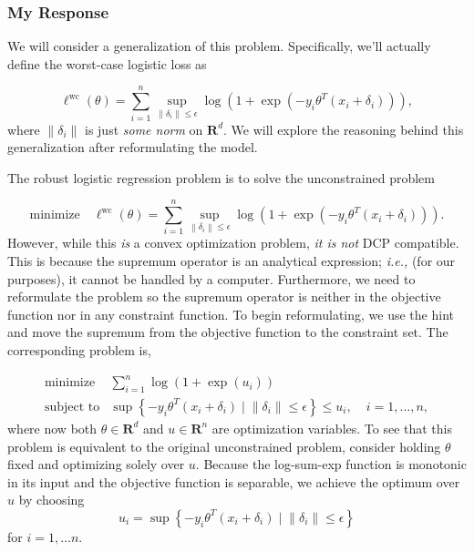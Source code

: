 \documentclass[12pt,reqno]{article}
\theoremstyle{definition}
\numberwithin{equation}{section}
\begin{document}
\subsubsection*{My Response}

\noindent We will consider a generalization of this problem. Specifically, we'll actually define the worst-case logistic loss as

\[
\ell^{\mathrm{wc}}(\theta)=\sum_{i=1}^n \sup _{\left\|\delta_i\right\| \leq \epsilon} \log \left(1+\exp \left(-y_i \theta^T\left(x_i+\delta_i\right)\right)\right),
\]
where $\left\lVert \delta_i \right\rVert$ is just \textit{some norm} on $\mathbf{R}^{d}$. We will explore the reasoning behind
this generalization after reformulating the model.

\noindent The robust logistic regression problem is to solve the unconstrained problem

\[\mathrm{minimize} \quad \ell^{\mathrm{wc}}(\theta)=\sum_{i=1}^n \sup _{\left\|\delta_i\right\| \leq \epsilon} \log \left(1+\exp \left(-y_i \theta^T\left(x_i+\delta_i\right)\right)\right).\]
However, while this \textit{is} a convex optimization problem, \textit{it is not} DCP compatible. This is because
the supremum operator is an analytical expression; \textit{i.e.,} (for our purposes), it cannot be handled by a computer.
Furthermore, we need to reformulate the problem so the supremum operator is neither in the objective function nor in any
constraint function. To begin reformulating, we use the hint and move the supremum from the objective function
to the constraint set. The corresponding problem is,

\[\begin{array}{lll}
\text{minimize} \; & \sum_{i=1}^n \log \left(1+\exp \left(u_i\right)\right) & \\
\text{subject to} & \sup \left\{-y_i \theta^T\left(x_i+\delta_i\right) \mid \left\lVert \delta_i \right\rVert \le \epsilon \right\} \le u_i, \; & i = 1, \ldots, n,
\end{array}\]
where now both $\theta \in \mathbf{R}^d$ and $u \in \mathbf{R}^n$ are optimization variables.
To see that this problem is equivalent to the original unconstrained problem, consider holding $\theta$ fixed
and optimizing solely over $u$. Because the log-sum-exp function is monotonic in its input and the objective function
is separable, we achieve the optimum over $u$ by choosing
\[u_i = \sup \left\{-y_i \theta^T\left(x_i+\delta_i\right) \mid \left\lVert \delta_i \right\rVert \le \epsilon \right\} \]
for $i = 1, \ldots n$. 
\end{document}
